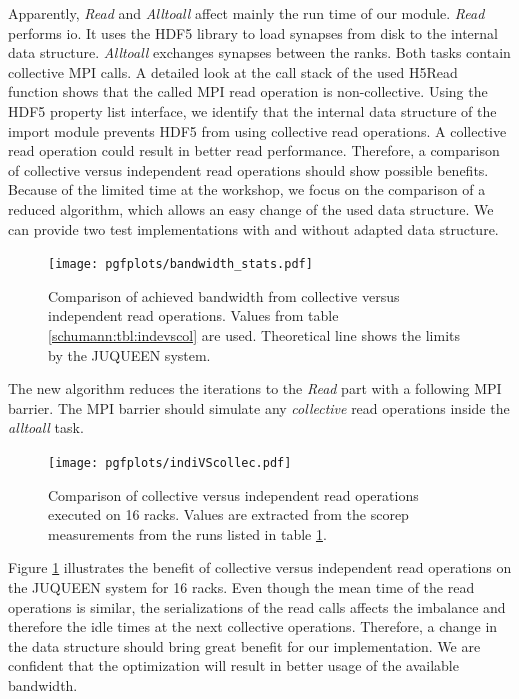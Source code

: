 Apparently, \emph{Read} and \emph{Alltoall} affect mainly the run time of our module.
\emph{Read} performs io. It uses the HDF5 library to load synapses from disk to the internal data structure.
\emph{Alltoall} exchanges synapses between the ranks. Both tasks contain collective MPI calls.
A detailed look at the call stack of the used H5Read function shows that the called MPI read operation is non-collective.
Using the HDF5 property list interface, we identify that the internal data structure of the import module prevents HDF5 from using collective read operations.
A collective read operation could result in better read performance.
Therefore, a comparison of collective versus independent read operations should show possible benefits.
Because of the limited time at the workshop, we focus on the comparison of a reduced algorithm,
which allows an easy change of the used data structure.
We can provide two test implementations with and without adapted data structure.
\begin{figure}[h!]
\begin{center}
 \texttt{[image: pgfplots/bandwidth\_stats.pdf]}
\end{center}
\caption{Comparison of achieved bandwidth from collective versus independent read operations.
 Values from table \ref{schumann:tbl:indevscol} are used. Theoretical line shows the limits by the
 JUQUEEN system.}
\end{figure}
The new algorithm reduces the iterations to the \emph{Read} part with a following MPI barrier.
The MPI barrier should simulate any \emph{collective} read operations inside the \emph{alltoall} task.
\begin{figure}[h!]
\begin{center}
 \texttt{[image: pgfplots/indiVScollec.pdf]}
\end{center}
\caption{Comparison of collective versus independent read operations executed on 16 racks.
 Values are extracted from the scorep measurements from the runs listed in table \ref{schumann:fig:indiVScollec}.}
 \label{schumann:fig:indiVScollec}
\end{figure}

\newpage
Figure \ref{schumann:fig:indiVScollec} illustrates the benefit of collective versus independent read operations
on the JUQUEEN system for 16 racks.
Even though the mean time of the read operations is similar, the serializations of the read calls affects the
imbalance and therefore the idle times at the next collective operations. 
Therefore, a change in the data structure should bring great benefit for our implementation.
We are confident that the optimization will result in better usage of the available bandwidth.

